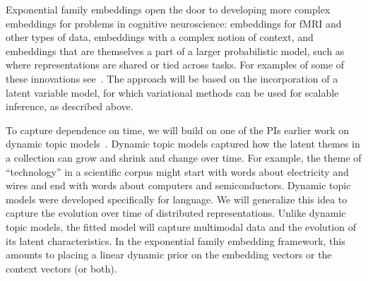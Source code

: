 Exponential family embeddings open
the door to developing more complex embeddings for
problems in cognitive neuroscience: embeddings for fMRI and other
types of data, embeddings with a complex notion of context, and
embeddings that are themselves a part of a larger probabilistic model,
such as where representations are shared or tied across tasks.  For
examples of some of these innovations see~\citet{Rudolph:2016b}.
The approach will be based on the incorporation of a latent variable model,
for which variational methods can be used for scalable inference, 
as described above.


To capture dependence on time, we will build on one of the PIs earlier
work on dynamic topic models~\citep{Blei:2006d}.  Dynamic topic models
captured how the latent themes in a collection can grow and shrink and
change over time.  For example, the theme of ``technology'' in a
scientific corpus might start with words about electricity and wires
and end with words about computers and semiconductors.
Dynamic topic models were developed specifically for language.  We
will generalize this idea to capture the evolution over time of distributed
representations.  Unlike dynamic topic models, the fitted model
will capture multimodal data and the evolution of its latent characteristics.
In the exponential family
embedding framework, this amounts to placing a linear dynamic prior on
the embedding vectors or the context vectors (or both).  
